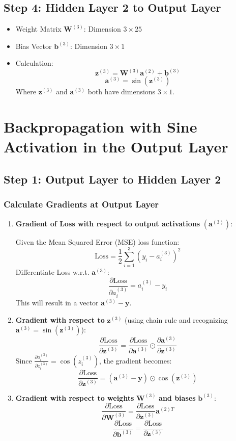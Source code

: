 \documentclass{article}
\begin{document}
\subsection*{Step 4: Hidden Layer 2 to Output Layer}
\begin{itemize}
  \item Weight Matrix $\mathbf{W}^{(3)}$: Dimension $3 \times 25$
  \item Bias Vector $\mathbf{b}^{(3)}$: Dimension $3 \times 1$
  \item Calculation:
  \[
  \mathbf{z}^{(3)} = \mathbf{W}^{(3)} \mathbf{a}^{(2)} + \mathbf{b}^{(3)}
  \]
  \[
  \mathbf{a}^{(3)} = \sin(\mathbf{z}^{(3)})
  \]
  Where $\mathbf{z}^{(3)}$ and $\mathbf{a}^{(3)}$ both have dimensions $3 \times 1$.
\end{itemize}



\section*{Backpropagation with Sine Activation in the Output Layer}

\subsection*{Step 1: Output Layer to Hidden Layer 2}

\subsubsection*{Calculate Gradients at Output Layer}
\begin{enumerate}
  \item \textbf{Gradient of Loss with respect to output activations} $(\mathbf{a}^{(3)})$:
  
  Given the Mean Squared Error (MSE) loss function:
  \[
  \text{Loss} = \frac{1}{2} \sum_{i=1}^{3} (y_i - a^{(3)}_i)^2
  \]
  Differentiate Loss w.r.t. $\mathbf{a}^{(3)}$:
  \[
  \frac{\partial \text{Loss}}{\partial a^{(3)}_i} = a^{(3)}_i - y_i
  \]
  This will result in a vector $\mathbf{a}^{(3)} - \mathbf{y}$.

  \item \textbf{Gradient with respect to} $\mathbf{z}^{(3)}$ (using chain rule and recognizing $\mathbf{a}^{(3)} = \sin(\mathbf{z}^{(3)})$):
  \[
  \frac{\partial \text{Loss}}{\partial \mathbf{z}^{(3)}} = \frac{\partial \text{Loss}}{\partial \mathbf{a}^{(3)}} \odot \frac{\partial \mathbf{a}^{(3)}}{\partial \mathbf{z}^{(3)}}
  \]
  Since $\frac{\partial a^{(3)}_i}{\partial z^{(3)}_i} = \cos(z^{(3)}_i)$, the gradient becomes:
  \[
  \frac{\partial \text{Loss}}{\partial \mathbf{z}^{(3)}} = (\mathbf{a}^{(3)} - \mathbf{y}) \odot \cos(\mathbf{z}^{(3)})
  \]

  \item \textbf{Gradient with respect to weights} $\mathbf{W}^{(3)}$ \textbf{and biases} $\mathbf{b}^{(3)}$:
  \[
  \frac{\partial \text{Loss}}{\partial \mathbf{W}^{(3)}} = \frac{\partial \text{Loss}}{\partial \mathbf{z}^{(3)}} \mathbf{a}^{(2)T}
  \]
  \[
  \frac{\partial \text{Loss}}{\partial \mathbf{b}^{(3)}} = \frac{\partial \text{Loss}}{\partial \mathbf{z}^{(3)}}
  \]
\end{enumerate}
\end{document}
